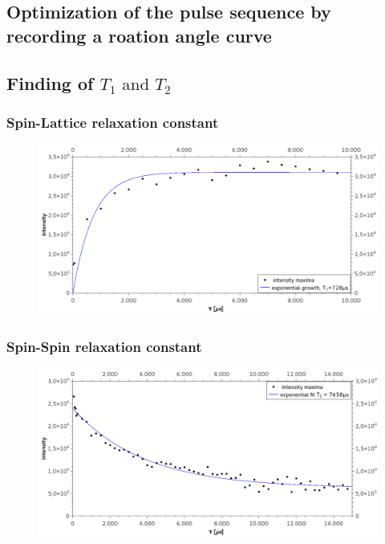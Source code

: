          
    \subsection{Optimization of the pulse sequence by recording a roation angle curve}
    \label{task_3}
    
    \subsection{Finding of $T_1 \text{ and } T_2$}
    \subsubsection{Spin-Lattice relaxation constant}
    \begin{figure}[h]
            \includegraphics[scale=0.3]{pic/T1.png}
    \end{figure}
    \subsubsection{Spin-Spin relaxation constant}
    \begin{figure}
            \includegraphics[scale=0.3]{pic/T2.png}
    \end{figure}
    
    \label{task_4}